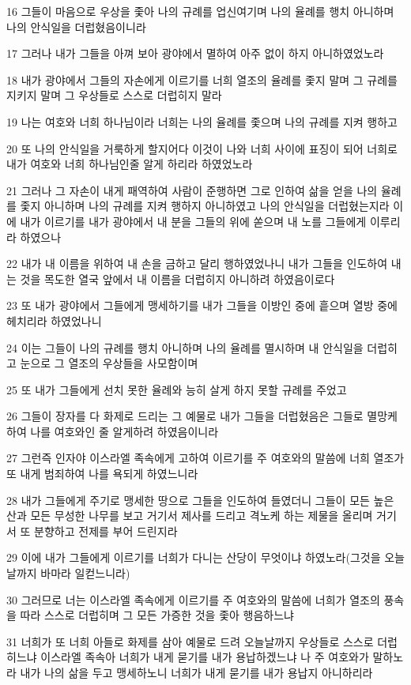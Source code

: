 \par 16 그들이 마음으로 우상을 좇아 나의 규례를 업신여기며 나의 율례를 행치 아니하며 나의 안식일을 더럽혔음이니라
\par 17 그러나 내가 그들을 아껴 보아 광야에서 멸하여 아주 없이 하지 아니하였었노라
\par 18 내가 광야에서 그들의 자손에게 이르기를 너희 열조의 율례를 좇지 말며 그 규례를 지키지 말며 그 우상들로 스스로 더럽히지 말라
\par 19 나는 여호와 너희 하나님이라 너희는 나의 율례를 좇으며 나의 규례를 지켜 행하고
\par 20 또 나의 안식일을 거룩하게 할지어다 이것이 나와 너희 사이에 표징이 되어 너희로 내가 여호와 너희 하나님인줄 알게 하리라 하였었노라
\par 21 그러나 그 자손이 내게 패역하여 사람이 준행하면 그로 인하여 삶을 얻을 나의 율례를 좇지 아니하며 나의 규례를 지켜 행하지 아니하였고 나의 안식일을 더럽혔는지라 이에 내가 이르기를 내가 광야에서 내 분을 그들의 위에 쏟으며 내 노를 그들에게 이루리라 하였으나
\par 22 내가 내 이름을 위하여 내 손을 금하고 달리 행하였었나니 내가 그들을 인도하여 내는 것을 목도한 열국 앞에서 내 이름을 더럽히지 아니하려 하였음이로다
\par 23 또 내가 광야에서 그들에게 맹세하기를 내가 그들을 이방인 중에 흩으며 열방 중에 헤치리라 하였었나니
\par 24 이는 그들이 나의 규례를 행치 아니하며 나의 율례를 멸시하며 내 안식일을 더럽히고 눈으로 그 열조의 우상들을 사모함이며
\par 25 또 내가 그들에게 선치 못한 율례와 능히 살게 하지 못할 규례를 주었고
\par 26 그들이 장자를 다 화제로 드리는 그 예물로 내가 그들을 더럽혔음은 그들로 멸망케 하여 나를 여호와인 줄 알게하려 하였음이니라
\par 27 그런즉 인자야 이스라엘 족속에게 고하여 이르기를 주 여호와의 말씀에 너희 열조가 또 내게 범죄하여 나를 욕되게 하였느니라
\par 28 내가 그들에게 주기로 맹세한 땅으로 그들을 인도하여 들였더니 그들이 모든 높은 산과 모든 무성한 나무를 보고 거기서 제사를 드리고 격노케 하는 제물을 올리며 거기서 또 분향하고 전제를 부어 드린지라
\par 29 이에 내가 그들에게 이르기를 너희가 다니는 산당이 무엇이냐 하였노라(그것을 오늘날까지 바마라 일컫느니라)
\par 30 그러므로 너는 이스라엘 족속에게 이르기를 주 여호와의 말씀에 너희가 열조의 풍속을 따라 스스로 더럽히며 그 모든 가증한 것을 좇아 행음하느냐
\par 31 너희가 또 너희 아들로 화제를 삼아 예물로 드려 오늘날까지 우상들로 스스로 더럽히느냐 이스라엘 족속아 너희가 내게 묻기를 내가 용납하겠느냐 나 주 여호와가 말하노라 내가 나의 삶을 두고 맹세하노니 너희가 내게 묻기를 내가 용납지 아니하리라

